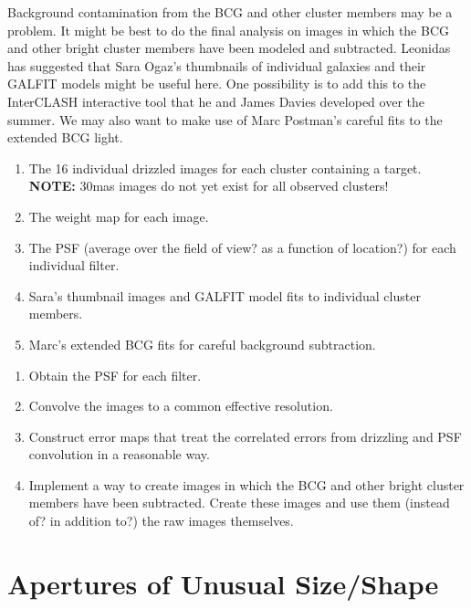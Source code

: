 \documentclass{emulateapj}
\begin{document}
Background contamination from the BCG and other cluster members may be
a problem.  It might be best to do the final analysis on images in
which the BCG and other bright cluster members have been modeled and
subtracted.  Leonidas has suggested that Sara Ogaz's thumbnails of
individual galaxies and their GALFIT models might be useful here.  One
possibility is to add this to the InterCLASH interactive tool that he
and James Davies developed over the summer.  We may also want to make
use of Marc Postman's careful fits to the extended BCG light.

\vspace{0.08in}
\vspace{-0.1in}
\begin{enumerate}\itemsep-6pt
\item The 16 individual drizzled images for each cluster containing a
  target.  {\bf{NOTE:}} 30mas images do not yet exist for all observed
  clusters! 
\item The weight map for each image.
\item The PSF (average over the field of view? as a function of
  location?) for each individual filter.
\item Sara's thumbnail images and GALFIT model fits to individual
  cluster members.
\item Marc's extended BCG fits for careful background subtraction.
\end{enumerate}

\vspace{-0.1in}
\begin{enumerate}\itemsep-6pt
\item Obtain the PSF for each filter.  
\item Convolve the images to a common effective resolution.
\item Construct error maps that treat the correlated errors from
  drizzling and PSF convolution in a reasonable way.
\item Implement a way to create images in which the BCG and other
  bright cluster members have been subtracted.  Create these images
  and use them (instead of? in addition to?) the raw images
  themselves.
\end{enumerate}



\section{Apertures of Unusual Size/Shape}\label{apertures}
\end{document}
